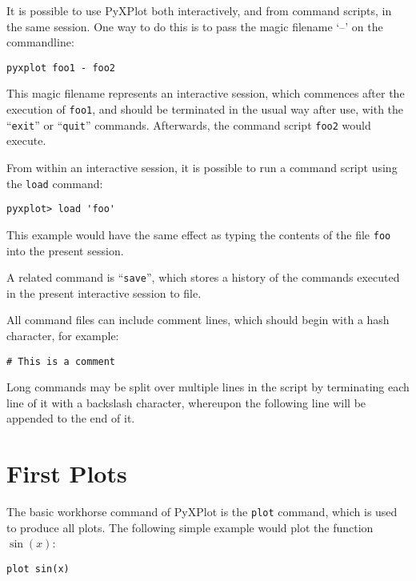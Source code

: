 \documentclass[a4paper,onecolumn,11pt]{book}
\begin{document}
It is possible to use PyXPlot both interactively, and from command scripts, in
the same session. One way to do this is to pass the magic filename `--' on the
commandline:

\begin{verbatim}
pyxplot foo1 - foo2
\end{verbatim}

\noindent This magic filename represents an interactive session, which
commences after the execution of \texttt{foo1}, and should be terminated in the
usual way after use, with the ``\texttt{exit}'' or ``\texttt{quit}'' commands.
Afterwards, the command script \texttt{foo2} would execute.

From within an interactive session, it is possible to run a command script
using the \texttt{load} command:

\begin{verbatim}
pyxplot> load 'foo'
\end{verbatim}

\noindent This example would have the same effect as typing the contents of the
file \texttt{foo} into the present session.

A related command is ``\texttt{save}'', which stores a history of the commands executed in the present
interactive session to file.

All command files can include comment lines, which should begin with a hash
character, for example:

\begin{verbatim}
# This is a comment
\end{verbatim}

Long commands may be split over multiple lines in the script by terminating
each line of it with a backslash character, whereupon the following line will
be appended to the end of it.

\section{First Plots}
\label{first_plots}

The basic workhorse command of PyXPlot is the \texttt{plot} command, which is
used to produce all plots. The following simple example would plot the function
$\sin(x)$:

\begin{verbatim}
plot sin(x)
\end{verbatim}
\end{document}
